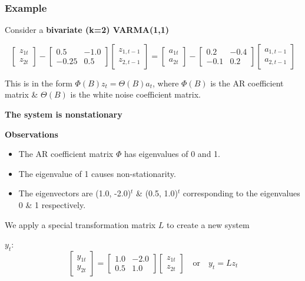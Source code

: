 \begin{frame}[allowframebreaks]
	\frametitle{Example}
	
	Consider a \textbf{bivariate (k=2) VARMA(1,1)}
	
	$$
	\begin{bmatrix} z_{1t} \\ z_{2t} \end{bmatrix} -
	\begin{bmatrix} 0.5 & -1.0 \\ -0.25 & 0.5 \end{bmatrix}
	\begin{bmatrix} z_{1,t-1} \\ z_{2,t-1} \end{bmatrix} =
	\begin{bmatrix} a_{1t} \\ a_{2t} \end{bmatrix} -
	\begin{bmatrix} 0.2 & -0.4 \\ -0.1 & 0.2 \end{bmatrix}
	\begin{bmatrix} a_{1,t-1} \\ a_{2,t-1} \end{bmatrix}$$
	
	This is in the form $\Phi(B)z_t = \Theta(B)a_t$, where $\Phi(B)$ is the AR coefficient matrix \& $\Theta(B)$ is the white noise coefficient matrix.
	
	\framebreak
	
	\textbf{The system is nonstationary}
	
	\textbf{Observations}
	\begin{itemize}
		\item The AR coefficient matrix $\Phi$ has eigenvalues of 0 and 1. 
		\item The eigenvalue of 1 causes non-stationarity.
		\item The eigenvectors are (1.0, -2.0)$^t$ \& (0.5, 1.0)$^t$ corresponding to the eigenvalues 0 \& 1 respectively.
	\end{itemize}
	
	\framebreak
	
	We apply a special transformation matrix $L$ to create a new system 
	
	$y_t$:$$\begin{bmatrix} y_{1t} \\ y_{2t} \end{bmatrix} =
	\begin{bmatrix} 1.0 & -2.0 \\ 0.5 & 1.0 \end{bmatrix}
	\begin{bmatrix} z_{1t} \\ z_{2t} \end{bmatrix} \quad \text{or} \quad y_t = Lz_t$$
	

\end{frame}
